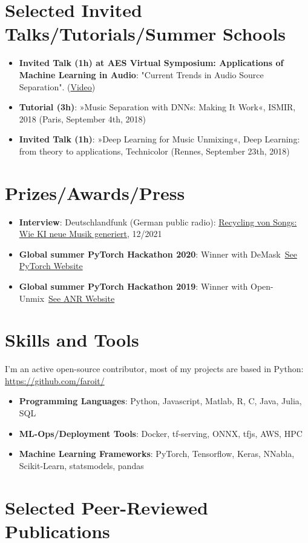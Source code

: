 \documentclass[a4paper,11pt]{article}
\newcommand{\resumeItem}[2]{
  \item\small{
    \textbf{#1}{: #2 \vspace{-2pt}}
  }
}
\newcommand{\resumeSubItem}[2]{\resumeItem{#1}{#2}\vspace{-4pt}}
\newcommand{\resumeSubHeadingListStart}{\begin{itemize}[leftmargin=*]}
\newcommand{\resumeSubHeadingListEnd}{\end{itemize}}
\begin{document}
\section{Selected Invited Talks/Tutorials/Summer Schools}
  \resumeSubHeadingListStart
    \resumeSubItem{Invited Talk (1h) at AES Virtual Symposium: Applications of Machine Learning in Audio}{
       "Current Trends in Audio Source Separation". (\href{https://www.youtube.com/watch?v=AB-F2JmI9U4}{Video})}
    \resumeSubItem{Tutorial (3h)}
       {»Music Separation with DNNs: Making It Work«, ISMIR, 2018 (Paris, September 4th, 2018)}
    \resumeSubItem{Invited Talk (1h)}
    {»Deep Learning for Music Unmixing«, Deep Learning: from
      theory to applications, Technicolor (Rennes, September 23th, 2018)}
  \resumeSubHeadingListEnd

\section{Prizes/Awards/Press}
\resumeSubHeadingListStart
    \resumeSubItem{Interview}{Deutschlandfunk (German public radio): \href{https://www.deutschlandfunkkultur.de/recycling-von-songs-wie-ki-neue-musik-generiert-dlf-kultur-90e01124-100.html}{Recycling von Songs: Wie KI neue Musik generiert}, 12/2021}
    \resumeSubItem{Global summer PyTorch Hackathon 2020}
        {Winner with DeMask~\href{https://pytorch.org/blog/announcing-the-winners-of-the-2020-global-pytorch-summer-hackathon/}{See PyTorch Website}}
    \resumeSubItem{Global summer PyTorch Hackathon 2019}
        {Winner with Open-Unmix~\href{https://anr.fr/fr/actualites-de-lanr/details/news/open-unmix-un-logiciel-open-source-issu-du-projet-anr-kamoulox-pour-demixer-la-musique/}{See ANR Website}}
\resumeSubHeadingListEnd

\section{Skills and Tools}
I'm an active open-source contributor, most of my projects are based in Python: \url{https://github.com/faroit/}
 \resumeSubHeadingListStart
   \resumeSubItem{Programming Languages}
     {Python, Javascript, Matlab, R, C, Java, Julia, SQL}
   \resumeSubItem{ML-Ops/Deployment Tools}
     {Docker, tf-serving, ONNX, tfjs, AWS, HPC}
   \resumeSubItem{Machine Learning Frameworks}
     {PyTorch, Tensorflow, Keras, NNabla, Scikit-Learn, statsmodels, pandas}
     \resumeSubHeadingListEnd
     
\section{Selected Peer-Reviewed Publications}
\end{document}
